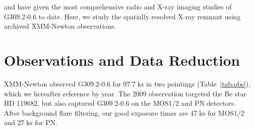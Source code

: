 \documentclass[preprint2,tighten,trackchanges]{aastex6}
\newcommand*{\mt}{\mathrm}
\newcommand*{\unit}[1]{\;\mt{#1}}  %
\begin{document}



 and  have given the most
comprehensive radio and X-ray imaging studies of G309.2-0.6 to date.
Here, we study the spatially resolved X-ray remnant using archived XMM-Newton
observations.


\section{Observations and Data Reduction} \label{sec:obs}

XMM-Newton observed G309.2-0.6 for $97.7 \unit{ks}$ in two pointings
(Table~\ref{tab:obs}), which we hereafter reference by year.
The 2009 observation targeted the Be star HD 119682, but also captured
G309.2-0.6 on the MOS1/2 and PN detectors.
After background flare filtering, our good exposure times are $47 \unit{ks}$
for MOS1/2 and $27 \unit{ks}$ for PN.


\end{document}
